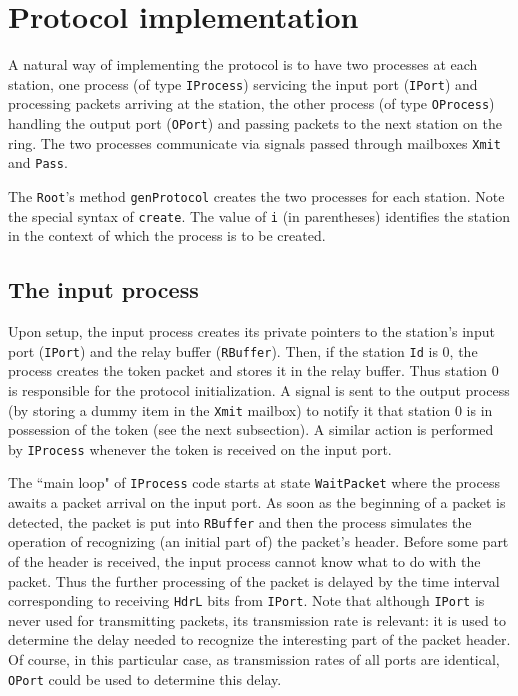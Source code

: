 \section{Protocol implementation}

A natural way of implementing the protocol is to have two
processes at each station, one process (of type {\tt IProcess})
servicing the input port ({\tt IPort}) and processing
packets arriving at the station, the other process (of type {\tt OProcess})
handling the output port ({\tt OPort})
and passing packets to the next station on the ring.
The two processes communicate via signals passed through mailboxes
{\tt Xmit} and {\tt Pass}.

The {\tt Root}'s method {\tt genProtocol} creates the two processes for each
station.
Note the special syntax of {\tt create}.
The value of {\tt i} (in parentheses) identifies the station in the context
of which the process is to be created.

\subsection{The input process}

Upon setup, the input process creates its private pointers to the station's
input port ({\tt IPort}) and the relay buffer ({\tt RBuffer}).
Then, if the station {\tt Id} is $0$, the process creates the token packet
and stores it in the relay buffer.
Thus station $0$ is responsible for the protocol initialization.
A signal is sent to the output process (by storing a
dummy item in the {\tt Xmit} mailbox) to notify it that
station $0$ is in possession of the token (see the next subsection).
A similar action is performed by {\tt IProcess} whenever the token is received
on the input port.

The ``main loop" of {\tt IProcess} code starts at state
{\tt WaitPacket} where the process awaits a packet arrival on the
input port.
As soon as the beginning of a packet is detected, the packet is put into
{\tt RBuffer} and then the process simulates the operation of
recognizing (an initial part of) the packet's header.
Before some part of the header
is received, the input process cannot know what to do with the packet.
Thus the further processing of the packet is delayed by the time
interval corresponding to receiving {\tt HdrL} bits from {\tt IPort}.
Note that although {\tt IPort} is never used for transmitting packets,
its transmission rate is relevant: it is used to determine the delay
needed to recognize the interesting part of the packet header.
Of course, in this particular case, as transmission rates of all ports are
identical, {\tt OPort} could be used to determine this delay.

